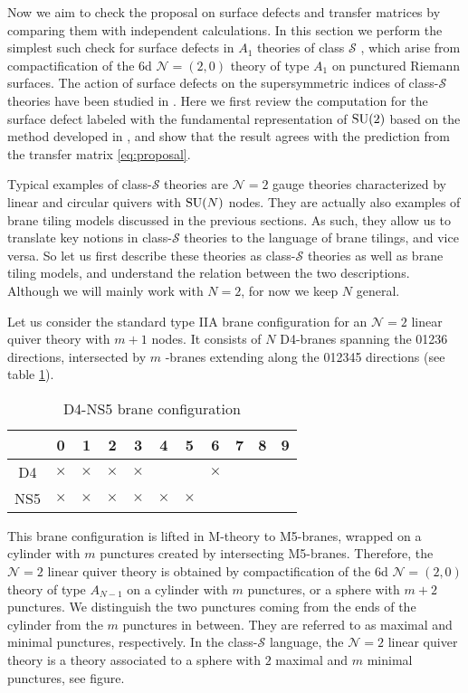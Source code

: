Now we aim to check the proposal on surface defects and transfer matrices
by comparing them with independent calculations. In this section we
perform the simplest such check for surface defects in $A_{1}$ theories
of class $\mathcal{S}$ \cite{Gaiotto:2009we,Gaiotto:2009hg}, which arise from compactification
of the 6d $\mathcal{N}=(2,0)$ theory of type $A_{1}$
on punctured Riemann surfaces. The action of surface defects on the
supersymmetric indices of class-$\mathcal{S}$ theories have been
studied in \cite{Gaiotto:2012xa, Gadde:2013dda, Alday:2013kda,Bullimore:2014nla}. Here we first review the computation for the surface
defect labeled with the fundamental representation of $\mathrm{SU}(2)$ based
on the method developed in \cite{Gaiotto:2012xa}, and show that the result agrees
with the prediction from the transfer matrix \eqref{eq:proposal}.

Typical examples of class-$\mathcal{S}$ theories are $\mathcal{N}=2$
gauge theories characterized by linear and circular quivers with $\mathrm{SU}(N)$
nodes. They are actually also examples of brane tiling models discussed
in the previous sections. As such, they allow us to translate key
notions in class-$\mathcal{S}$ theories to the language of brane
tilings, and vice versa. So let us first describe these theories as
class-$\mathcal{S}$ theories as well as brane tiling models, and
understand the relation between the two descriptions. Although we
will mainly work with $N=2$, for now we keep $N$ general.

Let us consider the standard type IIA brane configuration for an $\mathcal{N}=2$
linear quiver theory with $m+1$ nodes. It consists of $N$ D4-branes
spanning the 01236 directions, intersected by $m$ -branes extending
along the 012345 directions (see table \ref{tab:D4NS5}).
\begin{table}
\caption{D4-NS5 brane configuration}
\label{tab:D4NS5}
\vspace{0.2cm}
  \centering
    \begin{tabular}{|c|c|c|c|c|c|c|c|c|c|c|}
\hline
  & 0 & 1 & 2 & 3 & 4 & 5 & 6 & 7 & 8 & 9\tabularnewline
\hline
D4       & $\times$ & $\times$ & $\times$ & $\times$ &    &    &    $\times$ & \phantom{X} & \phantom{X} &  \tabularnewline
\hline
NS5    & $\times$ & $\times$ & $\times$ & $\times$ & $\times$ & $\times$ &    &    &    &  \phantom{X}  \tabularnewline
\hline
    \end{tabular}
\end{table}
This brane configuration is lifted in M-theory to M5-branes, wrapped
on a cylinder with $m$ punctures created by intersecting M5-branes.
Therefore, the $\mathcal{N}=2$ linear quiver theory is obtained by
compactification of the 6d $\mathcal{N}=( 2,0 )$ theory
of type $A_{N-1}$ on a cylinder with $m$ punctures, or a sphere
with $m+2$ punctures. We distinguish the two punctures coming from
the ends of the cylinder from the $m$ punctures in between. They
are referred to as maximal and minimal punctures, respectively. In
the class-$\mathcal{S}$ language, the $\mathcal{N}=2$ linear quiver
theory is a theory associated to a sphere with $2$ maximal and $m$
minimal punctures, see figure.

